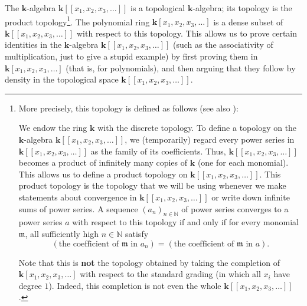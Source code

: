 \documentclass[numbers=enddot,12pt,final,onecolumn,notitlepage,abstracton]{scrartcl}%
\theoremstyle{definition}
\begin{document}
The $\mathbf{k}$-algebra $\mathbf{k}\left[  \left[  x_{1},x_{2},x_{3}%
,\ldots\right]  \right]  $ is a topological $\mathbf{k}$-algebra; its topology
is the product topology\footnote{More precisely, this topology is defined as
follows (see also \cite[proof of Corollary 2.6.11]{Reiner}):
\par
We endow the ring $\mathbf{k}$ with the discrete topology. To define a
topology on the $\mathbf{k}$-algebra $\mathbf{k}\left[  \left[  x_{1}%
,x_{2},x_{3},\ldots\right]  \right]  $, we (temporarily) regard every power
series in $\mathbf{k}\left[  \left[  x_{1},x_{2},x_{3},\ldots\right]  \right]
$ as the family of its coefficients. Thus, $\mathbf{k}\left[  \left[
x_{1},x_{2},x_{3},\ldots\right]  \right]  $ becomes a product of infinitely
many copies of $\mathbf{k}$ (one for each monomial). This allows us to define
a product topology on $\mathbf{k}\left[  \left[  x_{1},x_{2},x_{3}%
,\ldots\right]  \right]  $. This product topology is the topology that we will
be using whenever we make statements about convergence in $\mathbf{k}\left[
\left[  x_{1},x_{2},x_{3},\ldots\right]  \right]  $ or write down infinite
sums of power series. A sequence $\left(  a_{n}\right)  _{n\in\mathbb{N}}$ of
power series converges to a power series $a$ with respect to this topology if
and only if for every monomial $\mathfrak{m}$, all sufficiently high
$n\in\mathbb{N}$ satisfy%
\[
\left(  \text{the coefficient of }\mathfrak{m}\text{ in }a_{n}\right)
=\left(  \text{the coefficient of }\mathfrak{m}\text{ in }a\right)  .
\]
\par
Note that this is \textbf{not} the topology obtained by taking the completion
of $\mathbf{k}\left[  x_{1},x_{2},x_{3},\ldots\right]  $ with respect to the
standard grading (in which all $x_{i}$ have degree $1$). Indeed, this
completion is not even the whole $\mathbf{k}\left[  \left[  x_{1},x_{2}%
,x_{3},\ldots\right]  \right]  $.}. The polynomial ring $\mathbf{k}\left[
x_{1},x_{2},x_{3},\ldots\right]  $ is a dense subset of $\mathbf{k}\left[
\left[  x_{1},x_{2},x_{3},\ldots\right]  \right]  $ with respect to this
topology. This allows us to prove certain identities in the $\mathbf{k}%
$-algebra $\mathbf{k}\left[  \left[  x_{1},x_{2},x_{3},\ldots\right]  \right]
$ (such as the associativity of multiplication, just to give a stupid example)
by first proving them in $\mathbf{k}\left[  x_{1},x_{2},x_{3},\ldots\right]  $
(that is, for polynomials), and then arguing that they follow by density in
the topological space $\mathbf{k}\left[  \left[  x_{1},x_{2},x_{3}%
,\ldots\right]  \right]  $.
\end{document}
